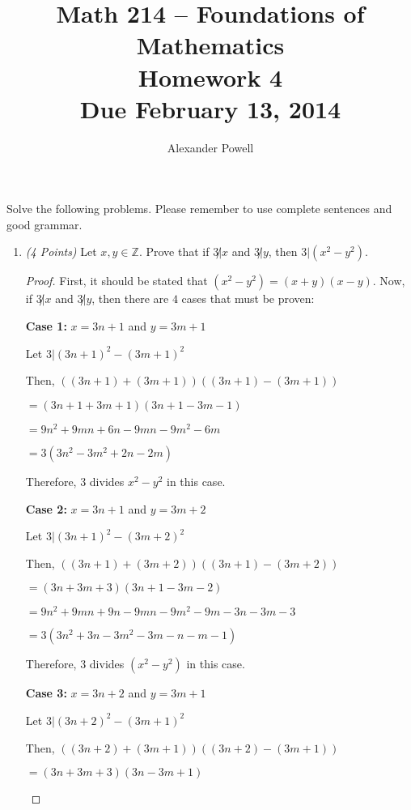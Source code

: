 \documentclass[10pt]{article} %
\title{Math 214 -- Foundations of Mathematics\\
Homework 4\\
{\large{\bf Due February 13, 2014}}}
\date{}
\author{Alexander Powell}
\newcommand{\Z}{\mathbb{Z}}
\newcommand{\points}[1]{{\it (#1 Points)}}
\begin{document}
\maketitle

Solve the following problems. Please remember to use complete sentences
and good grammar.

\begin{enumerate}


\item \points{4} Let $x,y\in \Z$. Prove that if $3\not| x$ and $3\not| y$, then $3 | (x^2-y^2)$.

\bigskip


\begin{proof}
First, it should be stated that $(x^2-y^2) = (x + y)(x - y)$.  Now, if $3\not| x$ and $3\not| y$, then there are $4$ cases that must be proven:
\begin{center} {\bf Case 1:} $x = 3n + 1$ and $y = 3m + 1$

Let $3 | (3n + 1)^2 - (3m + 1)^2$

Then, $((3n + 1) + (3m + 1))((3n + 1) - (3m + 1))$

$ = (3n + 1 + 3m + 1)(3n + 1 - 3m - 1)$

$ = 9n^2 + 9mn + 6n - 9mn - 9m^2 - 6m$

$ = 3(3n^2 - 3m^2 + 2n - 2m)$

Therefore, 3 divides $x^2 - y^2$ in this case.  
\end{center}

\begin{center} {\bf Case 2:} $x = 3n + 1$ and $y = 3m + 2$

Let $3 | (3n + 1)^2 - (3m + 2)^2$

Then, $((3n + 1) + (3m + 2))((3n + 1) - (3m + 2))$

$ = (3n + 3m + 3)(3n + 1 - 3m - 2)$

$ = 9n^2 + 9mn + 9n - 9mn - 9m^2 - 9m - 3n - 3m - 3$

$ = 3(3n^2 + 3n - 3m^2 - 3m - n - m - 1)$

Therefore, 3 divides $(x^2 - y^2)$ in this case.  
\end{center}
\begin{center} {\bf Case 3:} $x = 3n + 2$ and $y = 3m + 1$

Let $3 | (3n + 2)^2 - (3m + 1)^2$

Then, $((3n + 2) + (3m + 1))((3n + 2) - (3m + 1))$

$ = (3n + 3m + 3)(3n - 3m + 1)$


\end{center}
\end{proof}
\end{enumerate}
\end{document}
